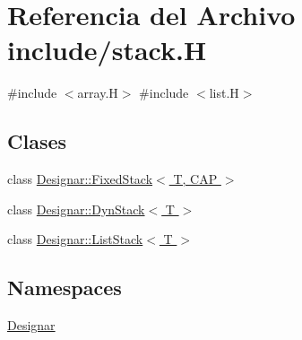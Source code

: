\hypertarget{stack_8_h}{}\section{Referencia del Archivo include/stack.H}
\label{stack_8_h}
{\ttfamily \#include $<$array.\+H$>$}\newline
{\ttfamily \#include $<$list.\+H$>$}\newline
\subsection*{Clases}
\begin{DoxyCompactItemize}
\item 
class \hyperlink{class_designar_1_1_fixed_stack}{Designar\+::\+Fixed\+Stack$<$ T, C\+A\+P $>$}
\item 
class \hyperlink{class_designar_1_1_dyn_stack}{Designar\+::\+Dyn\+Stack$<$ T $>$}
\item 
class \hyperlink{class_designar_1_1_list_stack}{Designar\+::\+List\+Stack$<$ T $>$}
\end{DoxyCompactItemize}
\subsection*{Namespaces}
\begin{DoxyCompactItemize}
\item 
 \hyperlink{namespace_designar}{Designar}
\end{DoxyCompactItemize}
